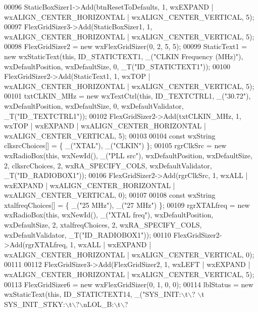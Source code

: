 \begin{DoxyCode}
00096     StaticBoxSizer1->Add(btnResetToDefaults, 1, wxEXPAND | wxALIGN\_CENTER\_HORIZONTAL | 
      wxALIGN\_CENTER\_VERTICAL, 5);
00097     FlexGridSizer3->Add(StaticBoxSizer1, 1, wxALIGN\_CENTER\_HORIZONTAL | wxALIGN\_CENTER\_VERTICAL, 5);
00098     FlexGridSizer2 = \textcolor{keyword}{new} wxFlexGridSizer(0, 2, 5, 5);
00099     StaticText1 = \textcolor{keyword}{new} wxStaticText(\textcolor{keyword}{this}, ID\_STATICTEXT1, \_(\textcolor{stringliteral}{"CLKIN Frequency (MHz)"}), wxDefaultPosition, 
      wxDefaultSize, 0, _T(\textcolor{stringliteral}{"ID\_STATICTEXT1"}));
00100     FlexGridSizer2->Add(StaticText1, 1, wxTOP | wxALIGN\_CENTER\_HORIZONTAL | wxALIGN\_CENTER\_VERTICAL, 5);
00101     txtCLKIN\_MHz = \textcolor{keyword}{new} wxTextCtrl(\textcolor{keyword}{this}, ID\_TEXTCTRL1, \_(\textcolor{stringliteral}{"30.72"}), wxDefaultPosition, wxDefaultSize, 0, 
      wxDefaultValidator, _T(\textcolor{stringliteral}{"ID\_TEXTCTRL1"}));
00102     FlexGridSizer2->Add(txtCLKIN\_MHz, 1, wxTOP | wxEXPAND | wxALIGN\_CENTER\_HORIZONTAL | 
      wxALIGN\_CENTER\_VERTICAL, 5);
00103 
00104     \textcolor{keyword}{const} wxString clksrcChoices[] = \{ \_(\textcolor{stringliteral}{"XTAL"}), \_(\textcolor{stringliteral}{"CLKIN"}) \};
00105     rgrClkSrc = \textcolor{keyword}{new} wxRadioBox(\textcolor{keyword}{this}, wxNewId(), \_(\textcolor{stringliteral}{"PLL src"}), wxDefaultPosition, wxDefaultSize, 2, 
      clksrcChoices, 2, wxRA\_SPECIFY\_COLS, wxDefaultValidator, _T(\textcolor{stringliteral}{"ID\_RADIOBOX1"}));
00106     FlexGridSizer2->Add(rgrClkSrc, 1, wxALL | wxEXPAND | wxALIGN\_CENTER\_HORIZONTAL | 
      wxALIGN\_CENTER\_VERTICAL, 0);
00107 
00108     \textcolor{keyword}{const} wxString xtalfreqChoices[] = \{ \_(\textcolor{stringliteral}{"25 MHz"}), \_(\textcolor{stringliteral}{"27 MHz"}) \};
00109     rgrXTALfreq = \textcolor{keyword}{new} wxRadioBox(\textcolor{keyword}{this}, wxNewId(), \_(\textcolor{stringliteral}{"XTAL freq"}), wxDefaultPosition, wxDefaultSize, 2, 
      xtalfreqChoices, 2, wxRA\_SPECIFY\_COLS, wxDefaultValidator, _T(\textcolor{stringliteral}{"ID\_RADIOBOX1"}));
00110     FlexGridSizer2->Add(rgrXTALfreq, 1, wxALL | wxEXPAND | wxALIGN\_CENTER\_HORIZONTAL | 
      wxALIGN\_CENTER\_VERTICAL, 0);
00111 
00112     FlexGridSizer3->Add(FlexGridSizer2, 1, wxLEFT | wxEXPAND | wxALIGN\_CENTER\_HORIZONTAL | 
      wxALIGN\_CENTER\_VERTICAL, 5);
00113     FlexGridSizer6 = \textcolor{keyword}{new} wxFlexGridSizer(0, 1, 0, 0);
00114     lblStatus = \textcolor{keyword}{new} wxStaticText(\textcolor{keyword}{this}, ID\_STATICTEXT14, \_(\textcolor{stringliteral}{"SYS\_INIT:\(\backslash\)t\(\backslash\)? \(\backslash\)t SYS\_INIT\_STKY:\(\backslash\)t\(\backslash\)?\(\backslash\)nLOL\_B:\(\backslash\)t\(\backslash\)? 
}
\end{DoxyCode}
